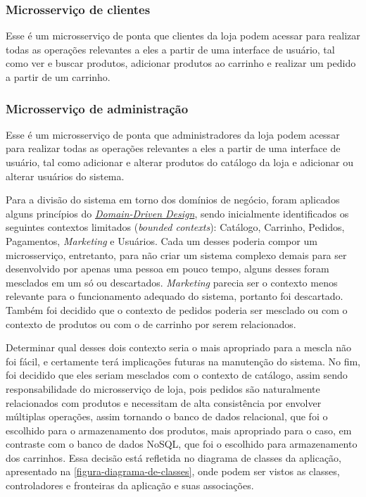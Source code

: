 \subsubsection*{Microsserviço de clientes}
Esse é um microsserviço de ponta que clientes da loja podem acessar para realizar todas as operações relevantes a eles a partir de uma interface de usuário, tal como ver e buscar produtos, adicionar produtos ao carrinho e realizar um pedido a partir de um carrinho.

\subsubsection*{Microsserviço de administração}
Esse é um microsserviço de ponta que administradores da loja podem acessar para realizar todas as operações relevantes a eles a partir de uma interface de usuário, tal como adicionar e alterar produtos do catálogo da loja e adicionar ou alterar usuários do sistema.


Para a divisão do sistema em torno dos domínios de negócio, foram aplicados alguns princípios do \hyperref[section-ddd]{\emph{Domain-Driven Design}}, sendo inicialmente identificados os seguintes contextos limitados (\emph{bounded contexts}): Catálogo, Carrinho, Pedidos, Pagamentos, \emph{Marketing} e Usuários. Cada um desses poderia compor um microsserviço, entretanto, para não criar um sistema complexo demais para ser desenvolvido por apenas uma pessoa em pouco tempo, alguns desses foram mesclados em um só ou descartados. \emph{Marketing} parecia ser o contexto menos relevante para o funcionamento adequado do sistema, portanto foi descartado. Também foi decidido que o contexto de pedidos poderia ser mesclado ou com o contexto de produtos ou com o de carrinho por serem relacionados.


Determinar qual desses dois contexto seria o mais apropriado para a mescla não foi fácil, e certamente terá implicações futuras na manutenção do sistema. No fim, foi decidido que eles seriam mesclados com o contexto de catálogo, assim sendo responsabilidade do microsserviço de loja, pois pedidos são naturalmente relacionados com produtos e necessitam de alta consistência por envolver múltiplas operações, assim tornando o banco de dados relacional, que foi o escolhido para o armazenamento dos produtos, mais apropriado para o caso, em contraste com o banco de dados NoSQL, que foi o escolhido para armazenamento dos carrinhos. Essa decisão está refletida no diagrama de classes da aplicação, apresentado na \autoref{figura-diagrama-de-classes}, onde podem ser vistos as classes, controladores e fronteiras da aplicação e suas associações.

